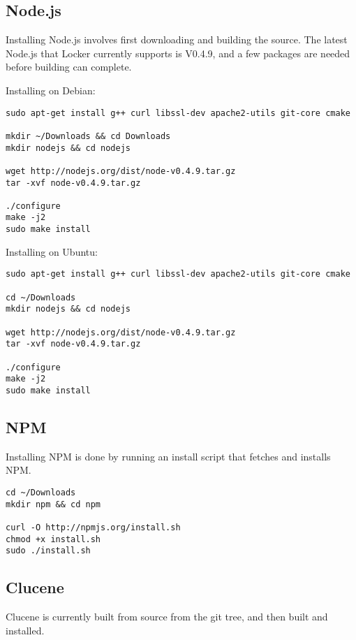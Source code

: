 \documentclass[A4paper,11pt]{article}
\begin{document}
\subsection{Node.js}
\label{subsec:Node.js}

Installing Node.js involves first downloading and building the source. The latest Node.js that Locker currently supports is V0.4.9, and a few packages are needed before building can complete.

Installing on Debian:
\begin{lstlisting}
sudo apt-get install g++ curl libssl-dev apache2-utils git-core cmake

mkdir ~/Downloads && cd Downloads
mkdir nodejs && cd nodejs

wget http://nodejs.org/dist/node-v0.4.9.tar.gz
tar -xvf node-v0.4.9.tar.gz 

./configure
make -j2
sudo make install
\end{lstlisting}

Installing on Ubuntu:
\begin{lstlisting}
sudo apt-get install g++ curl libssl-dev apache2-utils git-core cmake

cd ~/Downloads
mkdir nodejs && cd nodejs

wget http://nodejs.org/dist/node-v0.4.9.tar.gz
tar -xvf node-v0.4.9.tar.gz 

./configure
make -j2
sudo make install
\end{lstlisting}

\newpage
\subsection{NPM}
\label{subsec:NPM}

Installing NPM is done by running an install script that fetches and installs NPM.

\begin{lstlisting}
cd ~/Downloads
mkdir npm && cd npm

curl -O http://npmjs.org/install.sh
chmod +x install.sh
sudo ./install.sh
\end{lstlisting}

\subsection{Clucene}
\label{subsec:Clucene}

Clucene is currently built from source from the git tree, and then built and installed.
\end{document}
